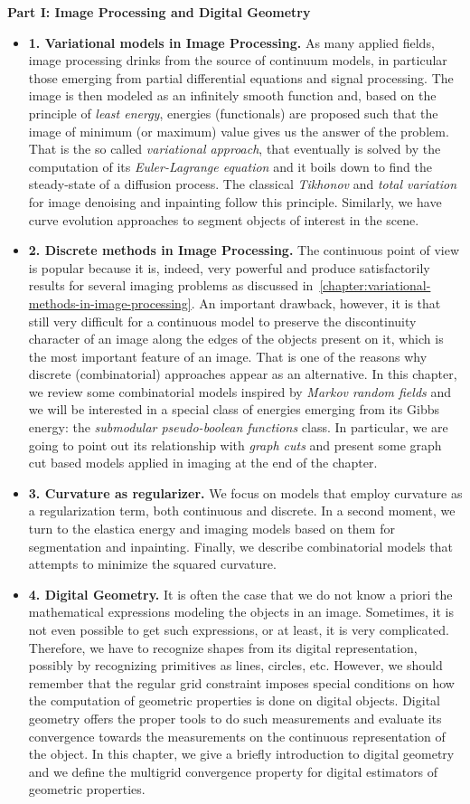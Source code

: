 \textbf{Part I: Image Processing and Digital Geometry}
\begin{itemize}
\item[]{\textbf{1. Variational models in Image Processing.} As many applied fields, image processing drinks from the source of continuum models, in particular those emerging from partial differential equations and signal processing.  The image is then modeled as an infinitely smooth function and, based on the principle of \emph{least energy}, energies (functionals) are proposed such that the image of minimum (or maximum) value gives us the answer of the problem. That is the so called \emph{variational approach}, that eventually is solved by the computation of its \emph{Euler-Lagrange equation} and it boils down to find the steady-state of a diffusion process. The classical \emph{Tikhonov} and \emph{total variation} for image denoising and inpainting follow this principle. Similarly, we have curve evolution approaches to segment  objects of interest in the scene.}
\item[]{\textbf{2. Discrete methods in Image Processing.} The continuous point of view is popular because it is, indeed, very powerful and produce satisfactorily results for several imaging problems as discussed in~\cref{chapter:variational-methods-in-image-processing}. An important drawback, however, it is that still very difficult for a continuous model to preserve the discontinuity character of an image along the edges of the objects present on it, which is the most important feature of an image. That is one of the reasons why discrete (combinatorial) approaches appear as an alternative. In this chapter, we review some combinatorial models inspired by \emph{Markov random fields} and we will be interested in a special class of energies emerging from its Gibbs energy: the \emph{submodular pseudo-boolean functions} class. In particular, we are going to point out its relationship with \emph{graph cuts} and present some graph cut based models applied in imaging at the end of the chapter.}
\item[]{\textbf{3. Curvature as regularizer.} We focus on models that employ curvature as a regularization term, both continuous and discrete. In a second moment, we turn to the elastica energy and imaging models based on them for segmentation and inpainting. Finally, we describe combinatorial models that attempts to minimize the squared curvature.}
\item[]{\textbf{4. Digital Geometry.} It is often the case that we do not know a priori the mathematical expressions modeling the objects in an image. Sometimes, it is not even possible to get such expressions, or at least, it is very complicated. Therefore, we have to recognize shapes from its digital representation, possibly by recognizing primitives as lines, circles, etc. However, we should remember that the regular grid constraint imposes special conditions on how the computation of geometric properties is done on digital objects. Digital geometry offers the proper tools to do such measurements and evaluate its convergence towards the measurements on the continuous representation of the object. In this chapter, we give a briefly introduction to digital geometry and we define the multigrid convergence property for digital estimators of geometric properties.}

\end{itemize}
